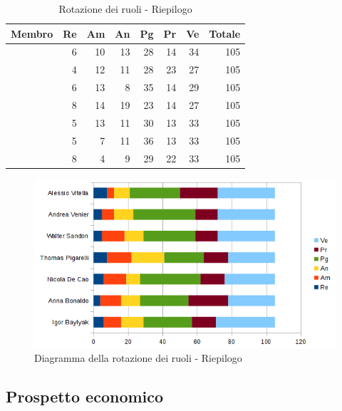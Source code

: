 \documentclass[12pt,a4paper]{article}
\begin{document}
\begin{table}[H]
	\begin{center}
		\begin{tabular}{l r r r r r r r}
			\toprule
			\textbf{Membro}	&	\textbf{Re}	&	\textbf{Am}	& \textbf{An} & \textbf{Pg} & \textbf{Pr} & \textbf{Ve} & \textbf{Totale}\\
			\midrule
			\midrule
			\IB & 6 & 10 & 13 & 28 & 14 & 34 & 105 \\
			\midrule
			\AB & 4 & 12 & 11 & 28 & 23 & 27 & 105 \\
			\midrule
			\NDC & 6 & 13 & 8 & 35 & 14 & 29 & 105 \\
			\midrule
			\TP & 8 & 14 & 19 & 23 & 14 & 27 & 105 \\
			\midrule
			\WS & 5 & 13 & 11 & 30 & 13 & 33 & 105 \\
			\midrule
			\AVE & 5 & 7 & 11 & 36 & 13 & 33 & 105 \\
			\midrule
			\AVI & 8 & 4 & 9 & 29 & 22 & 33 & 105 \\
			\bottomrule
		\end{tabular}
		\caption{Rotazione dei ruoli - Riepilogo}
	\end{center}
\end{table}

\begin{center}
	\begin{figure}[H]
		\centering		\includegraphics[width=\textwidth]{diagrammaBarreRiepilogoRotazioneRuoli.png}
		\caption{Diagramma della rotazione dei ruoli - Riepilogo}
	\end{figure}
\end{center}

\subsection{Prospetto economico}
\end{document}
